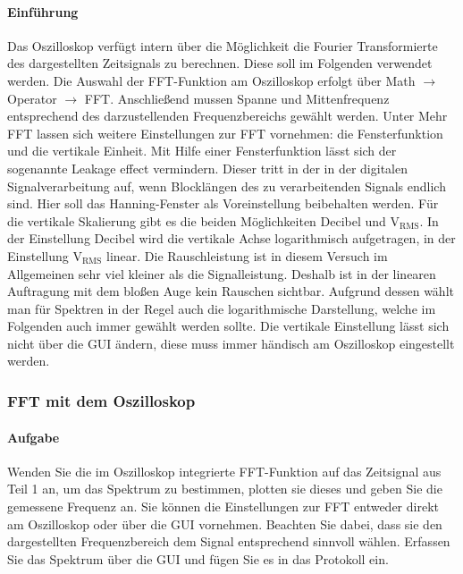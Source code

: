 \documentclass[10pt]{report}
\begin{document}
        \paragraph{Einführung}
        Das Oszilloskop verfügt intern über die Möglichkeit die Fourier Transformierte des dargestellten
        Zeitsignals zu berechnen. Diese soll im Folgenden verwendet werden.
        Die Auswahl der FFT-Funktion am Oszilloskop erfolgt über
        \glqq{}Math\grqq{} $\rightarrow$ \glqq{}Operator\grqq{} $\rightarrow$ \glqq{}FFT\grqq{}.
        Anschließend mussen Spanne und Mittenfrequenz entsprechend des darzustellenden Frequenzbereichs gewählt werden.
        Unter \glqq{} Mehr FFT\grqq{} lassen sich weitere Einstellungen
        zur FFT vornehmen: die Fensterfunktion und die vertikale Einheit.
        Mit Hilfe einer Fensterfunktion lässt sich der sogenannte \glqq{}Leakage effect\grqq{} vermindern.
        Dieser tritt in der in der digitalen Signalverarbeitung auf, wenn Blocklängen des zu verarbeitenden
        Signals endlich sind. Hier soll das \glqq{}Hanning-Fenster\grqq{} als Voreinstellung beibehalten
        werden.
        Für die vertikale Skalierung gibt es die beiden Möglichkeiten \glqq{}Decibel\grqq{} und
        \glqq{}$\text{V}_{\text{RMS}}$\grqq{}.
        In der Einstellung \glqq{}
        Decibel\grqq{} wird die vertikale Achse logarithmisch aufgetragen, in der
        Einstellung \glqq{}$\text{V}_{\text{RMS}}$\grqq{} linear. Die Rauschleistung ist in diesem Versuch im Allgemeinen sehr
        viel kleiner als die Signalleistung. Deshalb ist in der linearen Auftragung mit dem bloßen
        Auge kein Rauschen sichtbar. Aufgrund dessen wählt man für Spektren in der Regel auch
        die logarithmische Darstellung, welche im Folgenden auch immer gewählt werden sollte.
        Die vertikale Einstellung lässt sich nicht über die GUI ändern, diese muss immer händisch
        am Oszilloskop eingestellt werden.
        \subsubsection{FFT mit dem Oszilloskop}
        \paragraph{Aufgabe}
        Wenden Sie die im Oszilloskop integrierte FFT-Funktion auf das Zeitsignal aus
        Teil 1 an, um das Spektrum zu bestimmen, plotten sie dieses und geben Sie die
        gemessene Frequenz an. Sie können die Einstellungen zur FFT entweder direkt
        am Oszilloskop oder über die GUI vornehmen. Beachten Sie dabei, dass sie den
        dargestellten Frequenzbereich dem Signal entsprechend sinnvoll wählen. Erfassen
        Sie das Spektrum über die GUI und fügen Sie es in das Protokoll ein.
\end{document}
